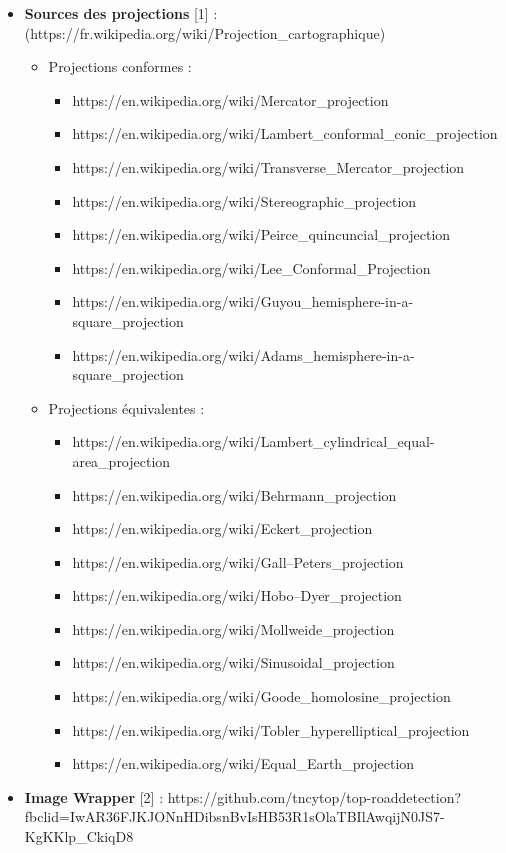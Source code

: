 \documentclass{article}
\begin{document}
\begin{itemize}
    \item \textbf{Sources des projections} [1] : (https://fr.wikipedia.org/wiki/Projection\_cartographique)
    \begin{itemize}
        \item Projections conformes :
        \begin{itemize}
            \item https://en.wikipedia.org/wiki/Mercator\_projection
            \item https://en.wikipedia.org/wiki/Lambert\_conformal\_conic\_projection
            \item https://en.wikipedia.org/wiki/Transverse\_Mercator\_projection
            \item https://en.wikipedia.org/wiki/Stereographic\_projection
            \item https://en.wikipedia.org/wiki/Peirce\_quincuncial\_projection
            \item https://en.wikipedia.org/wiki/Lee\_Conformal\_Projection
            \item https://en.wikipedia.org/wiki/Guyou\_hemisphere-in-a-square\_projection
            \item https://en.wikipedia.org/wiki/Adams\_hemisphere-in-a-square\_projection
        \end{itemize}
        \newpage
        \item Projections équivalentes :
        \begin{itemize}
            \item https://en.wikipedia.org/wiki/Lambert\_cylindrical\_equal-area\_projection
            \item https://en.wikipedia.org/wiki/Behrmann\_projection
            \item https://en.wikipedia.org/wiki/Eckert\_projection
            \item https://en.wikipedia.org/wiki/Gall–Peters\_projection
            \item https://en.wikipedia.org/wiki/Hobo–Dyer\_projection
            \item https://en.wikipedia.org/wiki/Mollweide\_projection
            \item https://en.wikipedia.org/wiki/Sinusoidal\_projection
            \item https://en.wikipedia.org/wiki/Goode\_homolosine\_projection
            \item https://en.wikipedia.org/wiki/Tobler\_hyperelliptical\_projection
            \item https://en.wikipedia.org/wiki/Equal\_Earth\_projection
        \end{itemize}
    \end{itemize}
    \item \textbf{Image Wrapper} [2] : https://github.com/tncytop/top-roaddetection?fbclid=IwAR36FJKJONnHDibsnBvIsHB53R1sOlaTBIlAwqijN0JS7-KgKKlp\_CkiqD8
\end{itemize}
\end{document}
